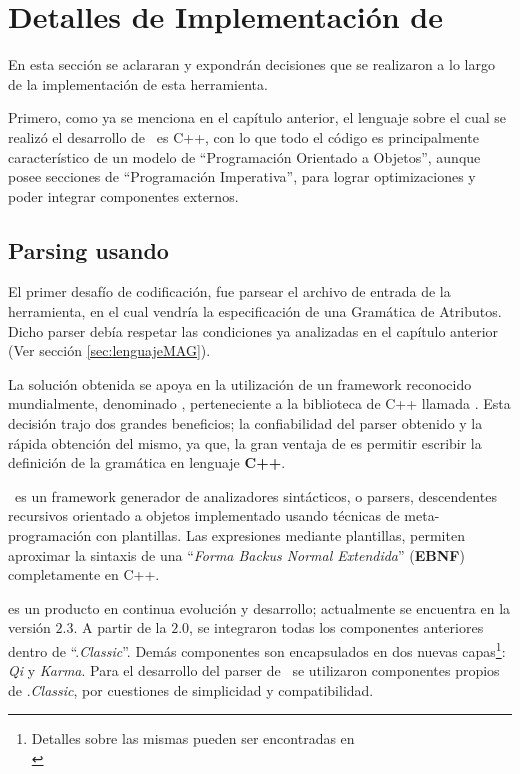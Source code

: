 \chapter{Detalles de Implementación de \maggen}
\label{chap:implem}
\minitoc

En esta sección se aclararan y expondrán decisiones que se realizaron a lo largo de la implementación de esta herramienta.

Primero, como ya se menciona en el capítulo anterior, el lenguaje sobre el cual se realizó el desarrollo de \maggen\ es C++, con lo que todo el código es principalmente característico de un modelo de ``Programación Orientado a Objetos'', aunque posee secciones de ``Programación Imperativa'', para lograr optimizaciones y poder integrar componentes externos.

\section{Parsing usando \boost\ \spirit}
\label{sec:par-spirit}
El primer desafío de codificación, fue parsear el archivo de entrada de la herramienta, en el cual vendría la especificación de una Gramática de Atributos. Dicho parser debía respetar las condiciones ya analizadas en el capítulo anterior (Ver sección \ref{sec:lenguajeMAG}). 

La solución obtenida se apoya en la utilización de un framework reconocido mundialmente, denominado \spirit, perteneciente a la biblioteca de C++ llamada \boost. Esta decisión trajo dos grandes beneficios; la confiabilidad del parser obtenido y la rápida obtención del mismo, ya que, la gran ventaja de \spirit es permitir escribir la definición de la gramática en lenguaje \textbf{C++}.

\spirit\ es un framework generador de analizadores sintácticos, o parsers, descendentes recursivos orientado a objetos implementado usando técnicas de meta-programación con plantillas. Las expresiones mediante plantillas, permiten aproximar la sintaxis de una ``\textit{\textit{Forma Backus Normal Extendida}}'' (\textbf{EBNF}) completamente en C++.

\spirit es un producto en continua evolución y desarrollo; actualmente se encuentra en la versión $2.3$. A partir de la $2.0$, se integraron todas los componentes anteriores dentro de ``\spirit.\textit{Classic}''. Demás componentes son encapsulados en dos nuevas capas\footnote{Detalles sobre las mismas pueden ser encontradas en\\ }: \textit{Qi} y \textit{Karma}. Para el desarrollo del parser de \maggen\ se utilizaron componentes propios de \spirit.\textit{Classic}, por cuestiones de simplicidad y compatibilidad. 

